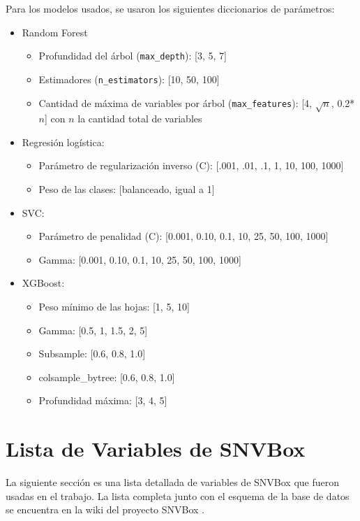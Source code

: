 Para los modelos usados, se usaron los siguientes diccionarios de parámetros:
\begin{itemize}
    \item Random Forest
        \begin{itemize}
            \item Profundidad del árbol (\texttt{max\_depth}): [3, 5, 7]
            \item Estimadores (\texttt{n\_estimators}): [10, 50, 100]
            \item Cantidad de máxima de variables por árbol (\texttt{max\_features}): [4, $\sqrt{n}$, 0.2*$n$] con $n$ la cantidad total de variables
        \end{itemize} 
    \item Regresión logística:
        \begin{itemize}
            \item Parámetro de regularización inverso (C): [.001, .01, .1, 1, 10, 100, 1000]
            \item Peso de las clases: [balanceado, igual a 1]
        \end{itemize}
    \item SVC:
        \begin{itemize}
            \item Parámetro de penalidad (C): [0.001, 0.10, 0.1, 10, 25, 50, 100, 1000]
            \item Gamma: [0.001, 0.10, 0.1, 10, 25, 50, 100, 1000]
        \end{itemize}
    \item XGBoost:
        \begin{itemize}
            \item Peso mínimo de las hojas: [1, 5, 10]
            \item Gamma: [0.5, 1, 1.5, 2, 5]
            \item Subsample: [0.6, 0.8, 1.0]
            \item colsample\_bytree: [0.6, 0.8, 1.0]
            \item Profundidad máxima: [3, 4, 5]
        \end{itemize}
\end{itemize}


\section{Lista de Variables de SNVBox} \label{snvbox_list}

La siguiente sección es una lista detallada de variables de SNVBox que fueron usadas en el trabajo. La lista completa junto con el esquema de la base de datos se encuentra en la wiki del proyecto SNVBox \cite{snvbox}. 

